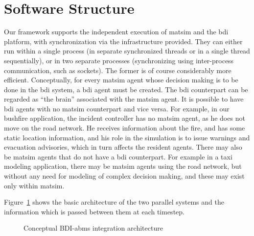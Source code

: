 \section{Software Structure}
\label{sec:bdi-structure}
Our framework supports the independent execution of \gls{matsim} and the \gls{bdi} platform, with 
synchronization via the infrastructure provided.
They can either run within a single process (in
separate synchronized threads or in a single thread sequentially), or in two
separate processes (synchronizing using inter-process communication, such as
sockets). The former is of course considerably more efficient. 
%
Conceptually, for every \gls{matsim} agent whose decision making is to be
done in the \gls{bdi} system, a \gls{bdi} agent must be created. The \gls{bdi} counterpart can
be regarded as ``the brain'' associated with the \gls{matsim} agent. It is
possible to have \gls{bdi} agents with no \gls{matsim} counterpart and vice
versa. For example, in our bushfire application, the incident
controller has no \gls{matsim} agent, as he does not move on the road
network. He receives information about the fire, and has some static
location information, and his role in the simulation is to issue
warnings and evacuation advisories, which in turn affects the resident
agents. There may also be \gls{matsim} agents that do not have a \gls{bdi}
counterpart. For example in a taxi modeling application, there may be
\gls{matsim} agents using the road network, but without any need for
modeling of complex decision making, and these may exist only within
\gls{matsim}. 

Figure~\ref{architecture} shows the basic architecture of the
two parallel systems and the information which is passed between them
at each timestep.

\begin{figure}
\centering
\resizebox{0.75\textwidth}{!}{

}
\caption{Conceptual BDI-\gls{abms} integration architecture}
\label{architecture}
\end{figure} 

